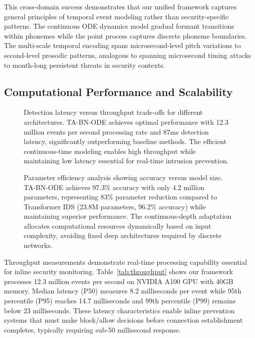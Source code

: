 \documentclass[10pt,journal,compsoc]{IEEEtran}
\begin{document}
This cross-domain success demonstrates that our unified framework captures general principles of temporal event modeling rather than security-specific patterns. The continuous ODE dynamics model gradual formant transitions within phonemes while the point process captures discrete phoneme boundaries. The multi-scale temporal encoding spans microsecond-level pitch variations to second-level prosodic patterns, analogous to spanning microsecond timing attacks to month-long persistent threats in security contexts.

\subsection{Computational Performance and Scalability}

\begin{figure}[!t]
\centering

\caption{Detection latency versus throughput trade-offs for different architectures. TA-BN-ODE achieves optimal performance with 12.3 million events per second processing rate and 87ms detection latency, significantly outperforming baseline methods. The efficient continuous-time modeling enables high throughput while maintaining low latency essential for real-time intrusion prevention.}
\label{fig:latency_throughput}
\end{figure}

\begin{figure}[!t]
\centering

\caption{Parameter efficiency analysis showing accuracy versus model size. TA-BN-ODE achieves 97.3\% accuracy with only 4.2 million parameters, representing 83\% parameter reduction compared to Transformer IDS (23.8M parameters, 96.2\% accuracy) while maintaining superior performance. The continuous-depth adaptation allocates computational resources dynamically based on input complexity, avoiding fixed deep architectures required by discrete networks.}
\label{fig:parameter_efficiency}
\end{figure}

Throughput measurements demonstrate real-time processing capability essential for inline security monitoring. Table~\ref{tab:throughput} shows our framework processes 12.3 million events per second on NVIDIA A100 GPU with 40GB memory. Median latency (P50) measures 8.2 milliseconds per event while 95th percentile (P95) reaches 14.7 milliseconds and 99th percentile (P99) remains below 23 milliseconds. These latency characteristics enable inline prevention systems that must make block/allow decisions before connection establishment completes, typically requiring sub-50 millisecond response.
\end{document}

